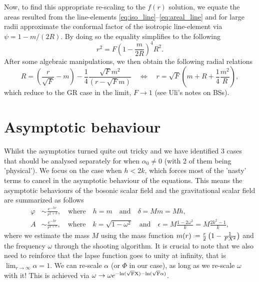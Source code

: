 \documentclass[12pt]{article}
\numberwithin{equation}{section}
\newcommand*{\defeq}{\mathrel{\vcenter{\baselineskip0.5ex \lineskiplimit0pt
                     \hbox{\scriptsize.}\hbox{\scriptsize.}}}%
                     =}
\begin{document}
Now, to find this appropriate re-scaling to the $f(r)$ solution, we equate the areas resulted from the line-elements \eqref{eq:iso_line}--\eqref{eq:areal_line} and for large radii approximate the conformal factor of the isotropic line-element via $\psi = 1 - m/(2R)$. By doing so the equality simplifies to the following
\begin{equation}
    r^2 = F \left(1- \frac{m}{2R} \right)^4 R^2.
\end{equation}
After some algebraic manipulations, we then obtain the following radial relations
\begin{equation}
    R = \left(\frac{r}{\sqrt{F}} -m \right) - \frac{1}{4}\frac{\sqrt{F}m^2}{\left(r - \sqrt{F}m \right)} \quad \Leftrightarrow \quad r = \sqrt{F} \left(m + R + \frac{1}{4}\frac{m^2}{R} \right),
\end{equation}
which reduce to the GR case in the limit, $F \to 1$ (see Uli's notes on BSs).

\section{Asymptotic behaviour}
Whilst the asymptotics turned quite out tricky and we have identified 3 cases that should be analysed separately for when $\alpha_0 \neq 0$ (with 2 of them being 'physical'). We focus on the case when $h < 2k$, which forces most of the 'nasty' terms to cancel in the asymptotic behaviour of the equations. This means the asymptotic behaviours of the bosonic scalar field and the gravitational scalar field are summarized as follows
\begin{align}
    \varphi & \sim \frac{e^{-hr}}{r^{1+\delta}}, \quad \text{where} \quad h=m \quad \text{and} \quad \delta = Mm = Mh, \label{eq:gravitational_asym}  \\
    A & \sim \frac{e^{-kr}}{r^{1+\epsilon}}, \quad \text{where} \quad k=\sqrt{1-\omega^2} \quad \text{and} \quad \epsilon = M\frac{1-2\omega^2}{k} = M\frac{2k^2-1}{k}, \label{eq:boson_asym} 
\end{align}
where we estimate the mass $M$ using the mass function $m(r) \defeq \frac{r}{2} \left(1-\frac{1}{FX^2}\right)$ and the frequency $\omega$ through the shooting algorithm. It is crucial to note that we also need to reinforce that the lapse function goes to unity at infinity, that is $\lim_{r \to \infty} \alpha = 1$. We can re-scale $\alpha$ (or $\Phi$ in our case), as long as we re-scale $\omega$ with it! This is achieved via $\omega \rightarrow \omega e^{-\rm{ln}(\sqrt{F}X) -\rm{ln}(\sqrt{F}\alpha)}$.
\end{document}
